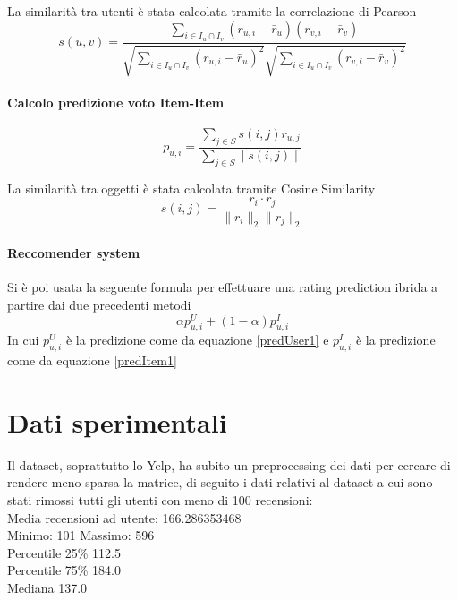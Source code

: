 \documentclass[12pt]{article}
\begin{document}
La similarità tra utenti è stata calcolata tramite la correlazione di Pearson
\begin{equation}
s(u,v) = \frac{\sum_{i \in I_u \cap I_v}(r_{u,i}-\bar{r}_u)(r_{v,i} - \bar{r}_v)}{\sqrt{\sum_{i \in I_u \cap I_v}(r_{u,i}-\bar{r}_u)^2} \sqrt{\sum_{i \in I_u \cap I_v}(r_{v,i} - \bar{r}_v)^2}}
\end{equation}

\paragraph*{Calcolo predizione voto Item-Item}
\begin{equation}
p_{u,i} = \frac{\sum_{j \in S}s(i,j)r_{u,j}}{\sum_{j \in S}\mid s(i,j) \mid}
\label{predItem1}
\end{equation}

La similarità tra oggetti è stata calcolata tramite Cosine Similarity
\begin{equation}
s(i,j) = \frac{r_i \cdot r_j}{\parallel r_i \parallel_2 \parallel r_j \parallel_2}
\end{equation}

\paragraph*{Reccomender system} Si è poi usata la seguente formula per effettuare una rating prediction ibrida a partire dai due precedenti metodi
\begin{equation}
\alpha p_{u,i}^U + (1-\alpha) p_{u,i}^I
\end{equation}
In cui $p_{u,i}^U$ è la predizione come da equazione \ref{predUser1} e $p_{u,i}^I$ è la 
predizione come da equazione \ref{predItem1}
\newpage
\section*{Dati sperimentali}
Il dataset, soprattutto lo Yelp, ha subito un preprocessing dei dati per cercare di rendere meno sparsa la matrice, di seguito i dati relativi al dataset a cui sono stati rimossi tutti gli utenti con meno di 100 recensioni:\\
Media recensioni ad utente: 166.286353468\\
Minimo: 101 Massimo: 596\\
Percentile 25\% 112.5\\
Percentile 75\% 184.0\\
Mediana 137.0\\
\end{document}
